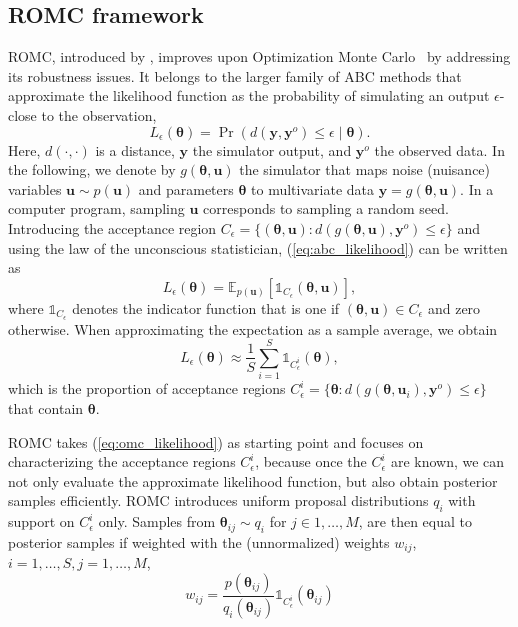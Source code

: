 \documentclass[twoside]{article}
\newcommand{\thb}{\boldsymbol{\theta}}
\newcommand{\ub}{\mathbf{u}}
\newcommand{\yb}{\mathbf{y}}
\newcommand{\data}{\mathbf{y}^o}
\newcommand{\accregioni}{C_{\epsilon}^i}
\newcommand{\E}{\mathbb{E}}
\begin{document}
\subsection{ROMC framework}
\label{subsec:ROMC}
ROMC, introduced by \citet{ikonomov2020robust}, improves upon Optimization Monte Carlo~\citet{meeds2015optimization} by addressing its robustness issues. 
It belongs to the larger family of ABC methods that approximate the likelihood function as the probability of simulating an output $\epsilon$-close to the observation,
\begin{equation}
L_\epsilon(\thb) = \Pr(d(\yb, \data) \leq \epsilon \mid \thb).
\label{eq:abc_likelihood}
\end{equation}
Here, $d(\cdot, \cdot)$ is a distance, $\yb$ the simulator output, and $\data$ the observed data. In the following, we denote by $g(\thb, \ub)$ the simulator that maps noise (nuisance) variables $\ub \sim p(\ub)$ and parameters $\thb$ to multivariate data $\yb = g(\thb, \ub)$. 
In a computer program, sampling $\ub$ corresponds to sampling a random seed.
Introducing the acceptance region $C_\epsilon = \{(\thb, \ub): d(g(\thb, \ub), \data)\le \epsilon\}$ and using the law of the unconscious statistician, (\ref{eq:abc_likelihood}) can be written as
\begin{equation}
    L_\epsilon(\thb) = \E_{p(\ub)}\left[\mathbb{1}_{C_\epsilon}(\thb, \ub) \right],
\end{equation}
where $\mathbb{1}_{C_\epsilon}$ denotes the indicator function that is one if $(\thb, \ub)\in C_\epsilon$ and zero otherwise. When approximating the expectation as a sample average, we obtain
\begin{equation}
    L_\epsilon(\thb) \approx \frac{1}{S} \sum_{i=1}^S \mathbb{1}_{\accregioni}(\thb),
    \label{eq:omc_likelihood}
\end{equation}
which is the proportion of acceptance regions $\accregioni = \{\thb : d(g(\thb, \ub_i), \data) \leq \epsilon \}$ that contain $\thb$.

ROMC takes (\ref{eq:omc_likelihood}) as starting point and focuses on characterizing the acceptance regions $\accregioni$, because once the $\accregioni$ are known, we can not only evaluate the approximate likelihood function, but also obtain posterior samples efficiently. ROMC introduces uniform proposal distributions $q_i$ with support on $\accregioni$ only. Samples from $\thb_{ij} \sim q_i$ for $j \in 1,\ldots, M$, are then equal to posterior samples if weighted with the (unnormalized) weights $w_{ij}$, $i=1, \ldots, S, j=1, \ldots, M$,
\begin{equation}
w_{ij} = \frac{p(\thb_{ij})}{q_i(\thb_{ij})} \mathbb{1}_{C^i_{\epsilon}}(\thb_{ij}) \label{eq:romc_weight}
\end{equation}
\end{document}
